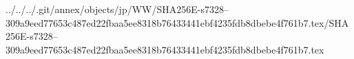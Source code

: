 ../../../.git/annex/objects/jp/WW/SHA256E-s7328--309a9eed77653c487ed22fbaa5ee8318b76433441ebf4235fdb8dbebe4f761b7.tex/SHA256E-s7328--309a9eed77653c487ed22fbaa5ee8318b76433441ebf4235fdb8dbebe4f761b7.tex